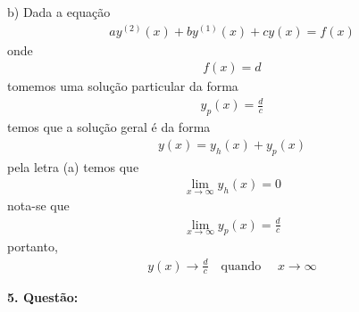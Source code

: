 \documentclass[a4paper,12pt]{article}
\begin{document}
b) Dada a equa\c c\~ao 
\begin{align*}
	ay^{(2)}(x) + by^{(1)}(x) + cy(x) = f(x)
\end{align*}
onde 
\begin{align*}
	f(x) = d
\end{align*}
tomemos uma solu\c c\~ao particular da forma
\begin{align*}
	y_p(x) = \frac{d}{c}
\end{align*}
temos que a solu\c c\~ao geral \'e da forma 
\begin{align*}
	y(x) = y_h(x) + y_p(x)
\end{align*}
pela letra (a) temos que
\begin{align*}
	\lim_{x \rightarrow \infty} y_h(x)  = 0
\end{align*}
nota-se que 
\begin{align*}
	\lim_{x \rightarrow \infty} y_p(x) = \frac{d}{c}
\end{align*}
portanto,
\begin{align*}
	y(x) \rightarrow \frac{d}{c} \quad \textrm{quando } \quad x \rightarrow  \infty
\end{align*}

\textbf{5. Quest\~ao:}\\
\end{document}
